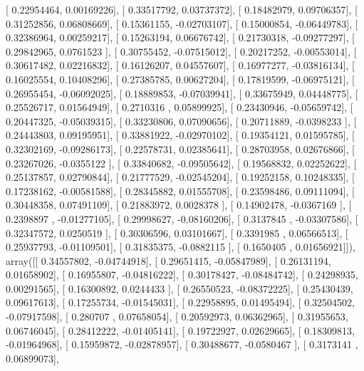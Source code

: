 \documentclass{article}
\begin{document}
       [ 0.22954464,  0.00169226],
       [ 0.33517792,  0.03737372],
       [ 0.18482979,  0.09706357],
       [ 0.31252856,  0.06808669],
       [ 0.15361155, -0.02703107],
       [ 0.15000854, -0.06449783],
       [ 0.32386964,  0.00259217],
       [ 0.15263194,  0.06676742],
       [ 0.21730318, -0.09277297],
       [ 0.29842965,  0.0761523 ],
       [ 0.30755452, -0.07515012],
       [ 0.20217252, -0.00553014],
       [ 0.30617482,  0.02216832],
       [ 0.16126207,  0.04557607],
       [ 0.16977277, -0.03816134],
       [ 0.16025554,  0.10408296],
       [ 0.27385785,  0.00627204],
       [ 0.17819599, -0.06975121],
       [ 0.26955454, -0.06092025],
       [ 0.18889853, -0.07039941],
       [ 0.33675949,  0.04448775],
       [ 0.25526717,  0.01564949],
       [ 0.2710316 ,  0.05899925],
       [ 0.23430946, -0.05659742],
       [ 0.20447325, -0.05039315],
       [ 0.33230806,  0.07090656],
       [ 0.20711889, -0.0398233 ],
       [ 0.24443803,  0.09195951],
       [ 0.33881922, -0.02970102],
       [ 0.19354121,  0.01595785],
       [ 0.32302169, -0.09286173],
       [ 0.22578731,  0.02385641],
       [ 0.28703958,  0.02676866],
       [ 0.23267026, -0.0355122 ],
       [ 0.33840682, -0.09505642],
       [ 0.19568832,  0.02252622],
       [ 0.25137857,  0.02790844],
       [ 0.21777529, -0.02545204],
       [ 0.19252158,  0.10248335],
       [ 0.17238162, -0.00581588],
       [ 0.28345882,  0.01555708],
       [ 0.23598486,  0.09111094],
       [ 0.30448358,  0.07491109],
       [ 0.21883972,  0.0028378 ],
       [ 0.14902478, -0.0367169 ],
       [ 0.2398897 , -0.01277105],
       [ 0.29998627, -0.08160206],
       [ 0.3137845 , -0.03307586],
       [ 0.32347572,  0.0250519 ],
       [ 0.30306596,  0.03101667],
       [ 0.3391985 ,  0.06566513],
       [ 0.25937793, -0.01109501],
       [ 0.31835375, -0.0882115 ],
       [ 0.1650405 ,  0.01656921]]), array([[ 0.34557802, -0.04744918],
       [ 0.29651415, -0.05847989],
       [ 0.26131194,  0.01658902],
       [ 0.16955807, -0.04816222],
       [ 0.30178427, -0.08484742],
       [ 0.24298935,  0.00291565],
       [ 0.16300892,  0.0244433 ],
       [ 0.26550523, -0.08372225],
       [ 0.25430439,  0.09617613],
       [ 0.17255734, -0.01545031],
       [ 0.22958895,  0.01495494],
       [ 0.32504502, -0.07917598],
       [ 0.280707  ,  0.07658054],
       [ 0.20592973,  0.06362965],
       [ 0.31955653,  0.06746045],
       [ 0.28412222, -0.01405141],
       [ 0.19722927,  0.02629665],
       [ 0.18309813, -0.01964968],
       [ 0.15959872, -0.02878957],
       [ 0.30488677, -0.0580467 ],
       [ 0.3173141 ,  0.06899073],
\end{document}
